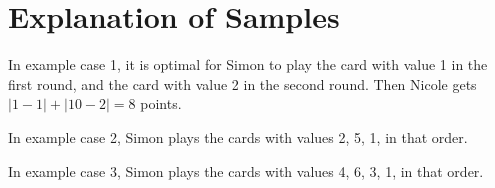 \section*{Explanation of Samples}
In example case 1, it is optimal for Simon to play the card with value 1 in the first round, and the card with value 2 in the second round. Then Nicole gets $|1-1| + |10-2| = 8$ points.

In example case 2, Simon plays the cards with values 2, 5, 1, in that order.

In example case 3, Simon plays the cards with values 4, 6, 3, 1, in that order.
